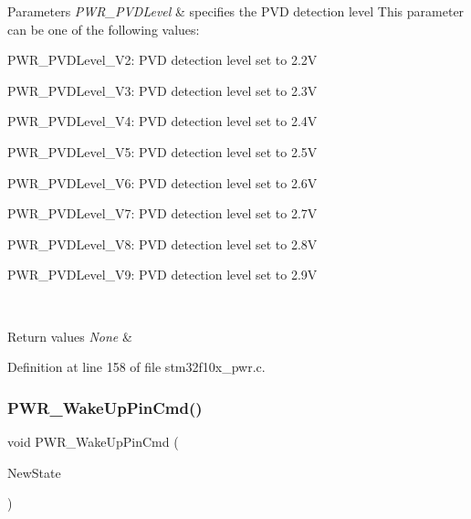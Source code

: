 \begin{DoxyParams}{Parameters}
{\em P\+W\+R\+\_\+\+P\+V\+D\+Level} & specifies the P\+VD detection level This parameter can be one of the following values\+: \begin{DoxyItemize}
\item P\+W\+R\+\_\+\+P\+V\+D\+Level\+\_\+V2\+: P\+VD detection level set to 2.\+2V \item P\+W\+R\+\_\+\+P\+V\+D\+Level\+\_\+V3\+: P\+VD detection level set to 2.\+3V \item P\+W\+R\+\_\+\+P\+V\+D\+Level\+\_\+V4\+: P\+VD detection level set to 2.\+4V \item P\+W\+R\+\_\+\+P\+V\+D\+Level\+\_\+V5\+: P\+VD detection level set to 2.\+5V \item P\+W\+R\+\_\+\+P\+V\+D\+Level\+\_\+V6\+: P\+VD detection level set to 2.\+6V \item P\+W\+R\+\_\+\+P\+V\+D\+Level\+\_\+V7\+: P\+VD detection level set to 2.\+7V \item P\+W\+R\+\_\+\+P\+V\+D\+Level\+\_\+V8\+: P\+VD detection level set to 2.\+8V \item P\+W\+R\+\_\+\+P\+V\+D\+Level\+\_\+V9\+: P\+VD detection level set to 2.\+9V \end{DoxyItemize}
\\
\hline
\end{DoxyParams}

\begin{DoxyRetVals}{Return values}
{\em None} & \\
\hline
\end{DoxyRetVals}


Definition at line 158 of file stm32f10x\+\_\+pwr.\+c.

\mbox{\label{group___p_w_r___private___functions_gae5fd6f9336ef8c60d5483651cb0d1a00}} 
\subsubsection{\texorpdfstring{P\+W\+R\+\_\+\+Wake\+Up\+Pin\+Cmd()}{PWR\_WakeUpPinCmd()}}
{\footnotesize\ttfamily void P\+W\+R\+\_\+\+Wake\+Up\+Pin\+Cmd (\begin{DoxyParamCaption}\item[{\hyperlink{group___exported__types_gac9a7e9a35d2513ec15c3b537aaa4fba1}{Functional\+State}}]{New\+State }\end{DoxyParamCaption})}



